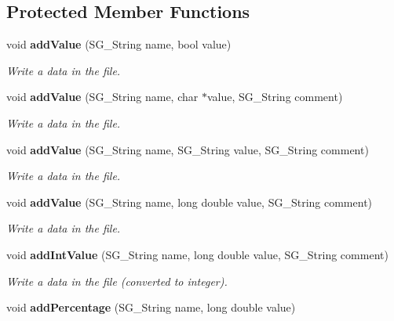 \subsection*{Protected Member Functions}
\begin{CompactItemize}
\item 
void {\bf add\-Value} (SG\_\-String name, bool value)\label{class_s_g___file___t_x_t_b0}

\begin{CompactList}\small\item\em Write a data in the file. \item\end{CompactList}\item 
void {\bf add\-Value} (SG\_\-String name, char $\ast$value, SG\_\-String comment)\label{class_s_g___file___t_x_t_b1}

\begin{CompactList}\small\item\em Write a data in the file. \item\end{CompactList}\item 
void {\bf add\-Value} (SG\_\-String name, SG\_\-String value, SG\_\-String comment)\label{class_s_g___file___t_x_t_b2}

\begin{CompactList}\small\item\em Write a data in the file. \item\end{CompactList}\item 
void {\bf add\-Value} (SG\_\-String name, long double value, SG\_\-String comment)\label{class_s_g___file___t_x_t_b3}

\begin{CompactList}\small\item\em Write a data in the file. \item\end{CompactList}\item 
void {\bf add\-Int\-Value} (SG\_\-String name, long double value, SG\_\-String comment)\label{class_s_g___file___t_x_t_b4}

\begin{CompactList}\small\item\em Write a data in the file (converted to integer). \item\end{CompactList}\item 
void {\bf add\-Percentage} (SG\_\-String name, long double value)\label{class_s_g___file___t_x_t_b5}


\end{CompactItemize}

